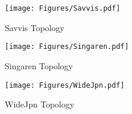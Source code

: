 \begin{figure}[htbp]
    \centering
    \texttt{[image: Figures/Savvis.pdf]}
    \caption{Savvis Topology}
    \label{fig:Saavis}
\end{figure}

\begin{figure}[htbp]
    \centering
    \texttt{[image: Figures/Singaren.pdf]}
    \caption{Singaren Topology}
    \label{fig:Singaren}
\end{figure}

\begin{figure}[htbp]
    \centering
    \texttt{[image: Figures/WideJpn.pdf]}
    \caption{WideJpn Topology}
    \label{fig:WideJpn}
\end{figure}
